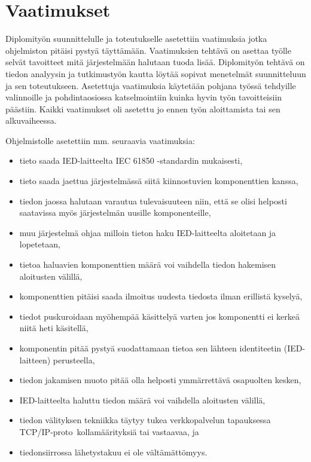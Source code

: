 \section{Vaatimukset}
\label{ch:vaatimukset}
Diplomityön suunnittelulle ja toteutukselle asetettiin vaatimuksia jotka ohjelmiston pitäisi pystyä täyttämään. Vaatimuksien tehtävä on asettaa työlle selvät tavoitteet mitä järjestelmään halutaan tuoda lisää. Diplomityön tehtävä on tiedon analyysin ja tutkimustyön kautta löytää sopivat menetelmät suunnitteluun ja sen toteutukseen. Asetettuja vaatimuksia käytetään pohjana työssä tehdyille valinnoille ja pohdintaosiossa katselmointiin kuinka hyvin työn tavoitteisiin päästiin. Kaikki vaatimukset oli asetettu jo ennen työn aloittamista tai sen alkuvaiheessa.

Ohjelmistolle asetettiin mm. seuraavia vaatimuksia:
\begin{itemize}
	\item tieto saada IED-laitteelta IEC 61850 -standardin mukaisesti,
	\item tieto saada jaettua järjestelmässä siitä kiinnostuvien komponenttien kanssa,
	\item tiedon jaossa halutaan varautua tulevaisuuteen niin, että se olisi helposti saatavissa myös järjestelmän uusille komponenteille,
	\item muu järjestelmä ohjaa milloin tieton haku IED-laitteelta aloitetaan ja lopetetaan,
	\item tietoa haluavien komponenttien määrä voi vaihdella tiedon hakemisen aloitusten välillä,	
	\item komponenttien pitäisi saada ilmoitus uudesta tiedosta ilman erillistä kyselyä,
	\item tiedot puskuroidaan myöhempää käsittelyä varten jos komponentti ei kerkeä niitä heti käsitellä,
	\item komponentin pitää pystyä suodattamaan tietoa sen lähteen identiteetin (IED-laitteen) perusteella,
	\item tiedon jakamisen muoto pitää olla helposti ymmärrettävä osapuolten kesken,
	\item IED-laitteelta haluttu tiedon määrä voi vaihdella aloitusten välillä,
	\item tiedon välityksen tekniikka täytyy tukea verkkopalvelun tapauksessa TCP/IP-pro\-to \-kol\-la\-mää\-ri\-tyk\-si\-ä tai vastaavaa, ja
	\item tiedonsiirrossa lähetystakuu ei ole vältämättömyys.
\end{itemize}

